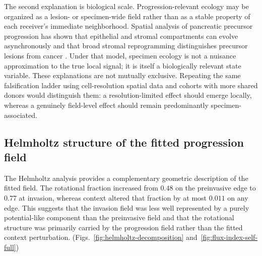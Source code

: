 The second explanation is biological scale. Progression-relevant ecology may be organized as a lesion- or specimen-wide field rather than as a stable property of each receiver's immediate neighborhood. Spatial analysis of pancreatic precursor progression has shown that epithelial and stromal compartments can evolve asynchronously and that broad stromal reprogramming distinguishes precursor lesions from cancer \autocite{Elhossiny2026-pq}. Under that model, specimen ecology is not a nuisance approximation to the true local signal; it is itself a biologically relevant state variable. These explanations are not mutually exclusive. Repeating the same falsification ladder using cell-resolution spatial data and cohorts with more shared donors would distinguish them: a resolution-limited effect should emerge locally, whereas a genuinely field-level effect should remain predominantly specimen-associated.

\subsection{Helmholtz structure of the fitted progression field}
\label{sec:helmholtz-discussion}

The Helmholtz analysis provides a complementary geometric description of the fitted field. The rotational fraction increased from $0.48$ on the preinvasive edge to $0.77$ at invasion, whereas context altered that fraction by at most $0.011$ on any edge. This suggests that the invasion field was less well represented by a purely potential-like component than the preinvasive field and that the rotational structure was primarily carried by the progression field rather than the fitted context perturbation. (Figs.~\ref{fig:helmholtz-decomposition} and~\ref{fig:flux-index-self-full})

